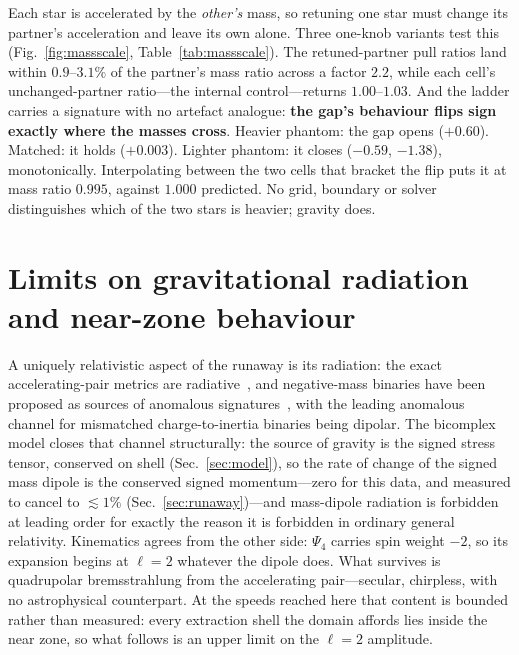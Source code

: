 \documentclass[twocolumn,floatfix,aps,prd,nofootinbib]{revtex4-2}
\begin{document}
Each star is accelerated by the \emph{other's} mass, so retuning one star must change its partner's acceleration and leave its own alone. Three one-knob variants test this (Fig.~\ref{fig:massscale}, Table~\ref{tab:massscale}). The retuned-partner pull ratios land within $0.9$--$3.1\%$ of the partner's mass ratio across a factor $2.2$, while each cell's unchanged-partner ratio---the internal control---returns $1.00$--$1.03$. And the ladder carries a signature with no artefact analogue: \textbf{the gap's behaviour flips sign exactly where the masses cross}. Heavier phantom: the gap opens ($+0.60$). Matched: it holds ($+0.003$). Lighter phantom: it closes ($-0.59$, $-1.38$), monotonically. Interpolating between the two cells that bracket the flip puts it at mass ratio $0.995$, against $1.000$ predicted. No grid, boundary or solver distinguishes which of the two stars is heavier; gravity does.

\section{Limits on gravitational radiation and near-zone behaviour}
\label{sec:weyl}

A uniquely relativistic aspect of the runaway is its radiation: the exact accelerating-pair metrics are radiative~\cite{bonnor_swami1964,bicak1983}, and negative-mass binaries have been proposed as sources of anomalous signatures~\cite{trivedi_loeb2026}, with the leading anomalous channel for mismatched charge-to-inertia binaries being dipolar. The bicomplex model closes that channel structurally: the source of gravity is the signed stress tensor, conserved on shell (Sec.~\ref{sec:model}), so the rate of change of the signed mass dipole is the conserved signed momentum---zero for this data, and measured to cancel to $\lesssim1\%$ (Sec.~\ref{sec:runaway})---and mass-dipole radiation is forbidden at leading order for exactly the reason it is forbidden in ordinary general relativity. Kinematics agrees from the other side: $\Psi_4$ carries spin weight $-2$, so its expansion begins at $\ell=2$ whatever the dipole does. What survives is quadrupolar bremsstrahlung from the accelerating pair---secular, chirpless, with no astrophysical counterpart. At the speeds reached here that content is bounded rather than measured: every extraction shell the domain affords lies inside the near zone, so what follows is an upper limit on the $\ell=2$ amplitude.
\end{document}

